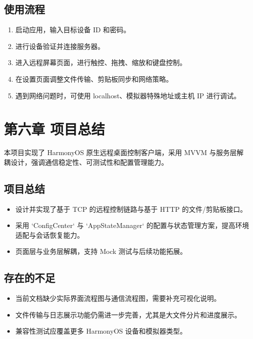 \documentclass[12pt,a4paper]{article}
\begin{document}
\subsection{使用流程}

\begin{enumerate}
    \item 启动应用，输入目标设备 ID 和密码。
    \item 进行设备验证并连接服务器。
    \item 进入远程屏幕页面，进行触控、拖拽、缩放和键盘控制。
    \item 在设置页面调整文件传输、剪贴板同步和网络策略。
    \item 遇到网络问题时，可使用 localhost、模拟器特殊地址或主机 IP 进行调试。
\end{enumerate}

\section{第六章 项目总结}

本项目实现了 HarmonyOS 原生远程桌面控制客户端，采用 MVVM 与服务层解耦设计，强调通信稳定性、可测试性和配置管理能力。

\subsection{项目总结}

\begin{itemize}
    \item 设计并实现了基于 TCP 的远程控制链路与基于 HTTP 的文件/剪贴板接口。
    \item 采用 `ConfigCenter` 与 `AppStateManager` 的配置与状态管理方案，提高环境适配与会话恢复能力。
    \item 页面层与业务层解耦，支持 Mock 测试与后续功能拓展。
\end{itemize}

\subsection{存在的不足}

\begin{itemize}
    \item 当前文档缺少实际界面流程图与通信流程图，需要补充可视化说明。
    \item 文件传输与日志展示功能仍需进一步完善，尤其是大文件分片和进度展示。
    \item 兼容性测试应覆盖更多 HarmonyOS 设备和模拟器类型。
\end{itemize}
\end{document}
